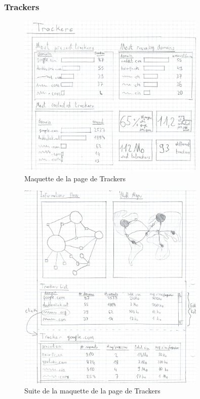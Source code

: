		\subsubsection{Trackers}

			\begin{figure}[!h]
				\centering
				\includegraphics[width=0.8\textwidth]{images/design/mockup_trackers1}
				\caption{Maquette de la page de Trackers}
				\label{d-mockup-trackers1}
			\end{figure}

			\begin{figure}[!h]
				\centering
				\includegraphics[width=0.8\textwidth]{images/design/mockup_trackers2}
				\caption{Suite de la maquette de la page de Trackers}
				\label{d-mockup-trackers2}
			\end{figure}
